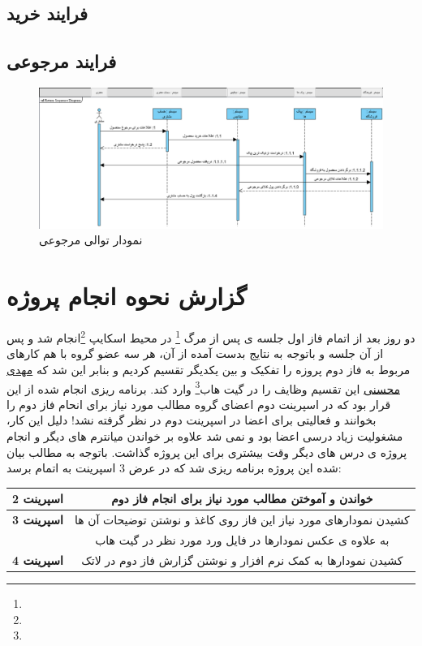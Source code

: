 \documentclass[12pt,a4paper]{article}
\begin{document}
	\subsection{فرایند خرید} \label{section.sequence.buy}
	
	
	\subsection{فرایند مرجوعی} \label{section.sequence.return}
		\begin{figure}[h!]
			\begin{center}
				\includegraphics[width=14cm]{images/Return Sequence Diagram.png}
			\end{center}
			\caption{نمودار توالی مرجوعی}
		\end{figure}
		
		\pagebreak
	

\pagebreak

\section{گزارش نحوه انجام پروژه} \label{section.report}
	دو روز بعد از اتمام فاز اول جلسه ی پس از مرگ \footnote{} در محیط اسکایپ \footnote{}انجام شد و پس از آن جلسه و باتوجه به نتایج بدست آمده از آن، هر سه عضو گروه با هم کارهای مربوط به فاز دوم پروزه را تفکیک و بین یکدیگر تقسیم کردیم و بنابر این شد که \underline{مهدی محسنی} این تقسیم وظایف را در گیت هاب\footnote{} وارد کند. برنامه ریزی انجام شده از این قرار بود که در اسپرینت دوم اعضای گروه مطالب مورد نیاز برای انحام فاز دوم را بخوانند و فعالیتی برای اعضا در اسپرینت دوم در نظر گرفته نشد! دلیل این کار، مشغولیت زیاد درسی اعضا بود و نمی شد علاوه بر خواندن میانترم های دیگر و انجام پروژه ی درس های دیگر وقت بیشتری برای این پروژه گذاشت. باتوجه به مطالب بیان شده این پروژه برنامه ریزی شد که در عرض 3 اسپرینت به اتمام برسد:
	\begin{center}
		\begin{tabular}{|c|c|} 
			\hline
			\textbf{اسپرینت 2 } & خواندن و آموختن مطالب مورد نیاز برای انجام فاز دوم\\
			\hline
			\hline
			\textbf{اسپرینت 3 } & کشیدن نمودارهای مورد نیاز این فاز روی کاغذ و  نوشتن توضیحات آن ها \\
						 & به علاوه ی عکس نمودارها در فایل ورد مورد نظر در گیت هاب \\
			\hline
			\hline
			\textbf{اسپرینت 4} & کشیدن نمودارها به کمک نرم افزار و نوشتن گزارش فاز دوم در لاتک\\
			\hline
		\end{tabular}
	\end{center}
\end{document}
